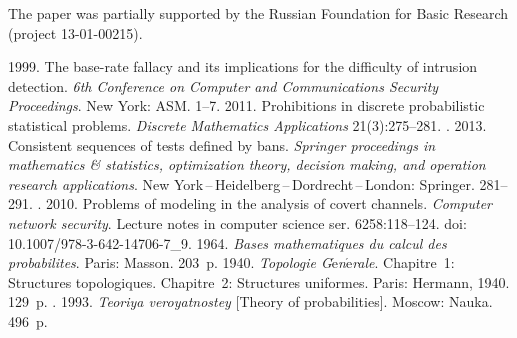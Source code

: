 


\vspace*{-20pt}

\Ack

\vspace*{-2pt}

\noindent
The paper was partially supported by the
Russian Foundation for Basic Research  (project 13-01-00215).


  \begin{multicols}{2}

\renewcommand{\bibname}{\protect\rmfamily References}



{\small\frenchspacing
 {%
 \begin{thebibliography}{9}
 1999. The base-rate fallacy and its implications for the
difficulty of intrusion detection.
\textit{6th Conference on Computer and Communications Security Proceedings}.
New York: ASM. 1--7.
 2011.
Prohibitions in discrete probabilistic statistical problems.
\textit{Discrete Mathematics Applications} 21(3):275--281.
. 2013. Consistent
sequences of tests defined by bans.
\textit{Springer proceedings in mathematics \& statistics, optimization theory,
decision making, and operation research applications}.
New York\,--\,Heidelberg\,--\,Dordrecht\,--\,London: Springer. 281--291.
.
2010. Problems of modeling in the analysis of covert channels.
\textit{Computer network security}.
Lecture notes in computer science ser. 6258:118--124.
doi: 10.1007/978-3-642-14706-7\_9.
 1964. \textit{Bases mathematiques du calcul des probabilites}.
Paris: Masson. 203~p.
 1940. \textit{Topologie G$\acute{\mbox{e}}$n$\acute{\mbox{e}}$rale}.
Chapitre~1: Structures topologiques. Chapitre~2: Structures uniformes.
Paris: Hermann, 1940. 129~p.
. 1993. \textit{Teoriya veroyatnostey}
[Theory of probabilities].  Moscow: Nauka. 496~p.

\end{thebibliography}

 }
 }

\end{multicols}

